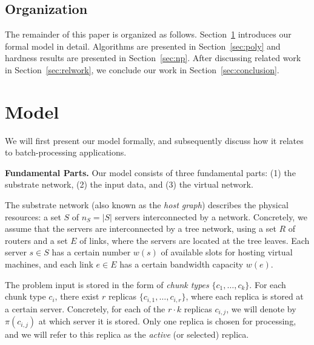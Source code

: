 \documentclass[9pt,twocolumn]{scrartcl}
\begin{document}
\subsection{Organization}

The remainder of this paper is organized as follows.
Section~\ref{sec:model} introduces our formal model in detail.
Algorithms are presented in Section~\ref{sec:poly} and
hardness results are presented in Section~\ref{sec:np}.
After discussing related work in Section~\ref{sec:relwork},
we conclude our work in Section~\ref{sec:conclusion}.


\section{Model}\label{sec:model}

We will first present our model formally, and subsequently discuss how it relates
to batch-processing applications.

\textbf{Fundamental Parts.} Our model consists of three fundamental parts: (1) the substrate network,
(2) the input data, and
(3) the virtual network.

The substrate network (also known as the \emph{host graph}) describes the physical resources: 
a set $S$ of $n_S=|S|$ servers interconnected by a network. Concretely, we assume 
that the servers are interconnected by a tree network, using a set $R$ of routers and a set $E$ of links,
where the servers are located at the tree leaves. Each server $s\in S$ has a certain number
$w(s)$ of available slots for hosting virtual machines, and each link $e\in E$ has a certain bandwidth
capacity $w(e)$. 

The problem input is stored in the form of \emph{chunk types} $\{c_1, \ldots, c_k\}$.  For each chunk type $c_i$,
there exist $r$ replicas $\{c_{i,1},\ldots, c_{i,r}\}$, where each replica is stored at a certain server. 
Concretely, for each of the $r\cdot k$ replicas $c_{i,j}$, we will denote by $\pi(c_{i,j})$ at
which server it is stored. Only one replica is chosen for processing, and we will refer to this
replica as the \emph{active} (or selected) replica.
\end{document}

